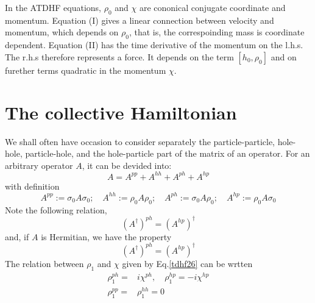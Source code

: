   \begin{note}
    In the ATDHF equations, $\rho_0$ and $\chi$ are cononical conjugate coordinate and momentum. Equation (I) gives a linear connection between velocity and momentum, which depends on $\rho_0$, that is, the correspoinding mass is coordinate dependent. Equation (II) has the time derivative of the momentum on the l.h.s. The r.h.s therefore represents a force. It depends on the term $[h_0,\rho_0]$ and on furether terms quadratic in the momentum $\chi$. 
  \end{note}

  \section{The collective Hamiltonian}
  \begin{note}
      We shall often have occasion to consider separately the particle-particle, hole-hole, particle-hole, and the hole-particle part of the matrix of an operator. For an arbitrary operator $A$, it can be devided into:
    \begin{equation}
      A = A^{pp} + A^{hh} + A^{ph} + A^{hp} \label{tdhf52}
    \end{equation}
    with definition
    \begin{equation}
      A^{pp}:= \sigma_0 A \sigma_0; \quad  A^{hh}:= \rho_0 A \rho_0; \quad A^{ph}:=\sigma_0 A \rho_0; \quad A^{hp}:=\rho_0 A \sigma_0 \label{tdhf53}
    \end{equation}
    Note the following relation,
    \begin{equation}
      (A^\dagger)^{ph} = (A^{hp})^\dagger \label{tdhf54}
    \end{equation}
    and, if $A$ is Hermitian, we have the property
    \begin{equation}
      (A^\dagger)^{ph} = (A^{hp})^\dagger \label{tdhf55}
    \end{equation}
    The relation between $\rho_1$ and $\chi$ given by Eq.\eqref{tdhf26} can be wrtten
    \begin{equation}
      \begin{aligned}
        \rho_1^{ph} =& i\chi^{ph}, \quad \rho_1^{hp} = -i\chi^{hp}\\  \label{tdhf56}
        \rho_1^{pp} =& \rho_1^{hh} =0
      \end{aligned}
    \end{equation}
  \end{note}

